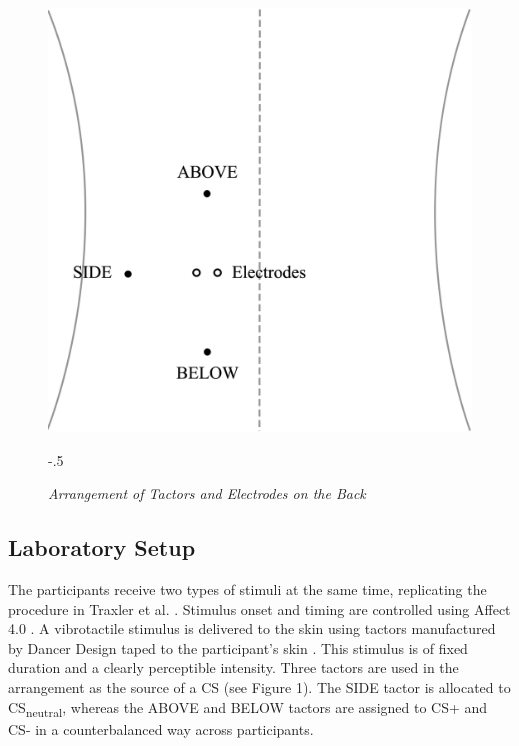 \documentclass[empirical,issue, twocolumn,authordate]{jote-new-article}
\begin{document}
\begin{figure}[t!]
\captionsetup{width=\dimexpr \linewidth+\fullwidthlen\relax}
\begin{fullwidth}
\includegraphics[width=\linewidth]{media/Other,+Figure+1.png}
\end{fullwidth}
\begin{adjustwidth}{-.5\fullwidthlen}{}
\caption{\emph{Arrangement of Tactors and Electrodes on the Back \parencite[][Adapted from]{Traxler2019}}}
\label{fig:fig4}
\end{adjustwidth}
\baselineskip
\end{figure}
\subsection{Laboratory Setup}

The participants receive two types of stimuli at the same time, replicating the procedure in Traxler et al. \parencite{Traxler2019}. Stimulus onset and timing are controlled using Affect 4.0 \parencite{Spruyt2009}. A vibrotactile stimulus is delivered to the skin using tactors manufactured by Dancer Design taped to the participant's skin \parencite{Dancer Design0}. This stimulus is of fixed duration and a clearly perceptible intensity. Three tactors are used in the arrangement as the source of a CS (see Figure 1). The SIDE tactor is allocated to CS\textsubscript{neutral}, whereas the ABOVE and BELOW tactors are assigned to CS+ and CS- in a counterbalanced way across participants.
\end{document}
